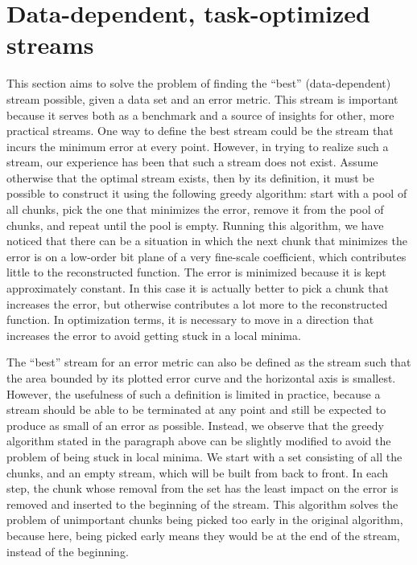 \section{Data-dependent, task-optimized streams}
\label{sec:data_dep_streams}

This section aims to solve the problem of finding the ``best'' (data-dependent) stream possible,
given a data set and an error metric. This stream is important because it serves both as a benchmark
and a source of insights for other, more practical streams. One way to define the best stream could
be the stream that incurs the minimum error at every point. However, in trying to realize such a
stream, our experience has been that such a stream does not exist. Assume otherwise that the optimal
stream exists, then by its definition, it must be possible to construct it using the following
greedy algorithm: start with a pool of all chunks, pick the one that minimizes the error, remove it
from the pool of chunks, and repeat until the pool is empty. Running this algorithm, we have noticed
that there can be a situation in which the next chunk that minimizes the error is on a low-order bit
plane of a very fine-scale coefficient, which contributes little to the reconstructed function. The
error is minimized because it is kept approximately constant. In this case it is actually better to
pick a chunk that increases the error, but otherwise contributes a lot more to the reconstructed
function. In optimization terms, it is necessary to move in a direction that increases the error to
avoid getting stuck in a local minima.

The ``best'' stream for an error metric can also be defined as the stream such that the area bounded
by its plotted error curve and the horizontal axis is smallest. However, the usefulness of such a
definition is limited in practice, because a stream should be able to be terminated at any point and
still be expected to produce as small of an error as possible. Instead, we observe that the greedy
algorithm stated in the paragraph above can be slightly modified to avoid the problem of being stuck
in local minima. We start with a set consisting of all the chunks, and an empty stream, which will
be built from back to front. In each step, the chunk whose removal from the set has the least impact
on the error is removed and inserted to the beginning of the stream. This algorithm solves the
problem of unimportant chunks being picked too early in the original algorithm, because here, being
picked early means they would be at the end of the stream, instead of the beginning.

